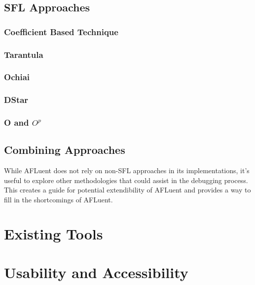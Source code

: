 \subsection{SFL Approaches}
\label{subsec:sfl}

\subsubsection{Coefficient Based Technique}
\label{subsubsec:coefficient_based}

\subsubsection{Tarantula}
\label{subsubsec:tarantula_lit}

\subsubsection{Ochiai}
\label{subsubsec:ochiai_lit}

\subsubsection{DStar}
\label{subsubsec:dstar_lit}

\subsubsection{O and \textbf{$O^p$}}
\label{subsubsec:o_lit}

\subsection{Combining Approaches}
\label{subsec:combining_approaches}

While AFLuent does not rely on non-SFL approaches in its implementations, it's
useful to explore other methodologies that could assist in the debugging
process. This creates a guide for potential extendibility of AFLuent and
provides a way to fill in the shortcomings of AFLuent.

\section{Existing Tools}
\label{sec:existing_tools}

\section{Usability and Accessibility}
\label{sec:usability_accessibility}

